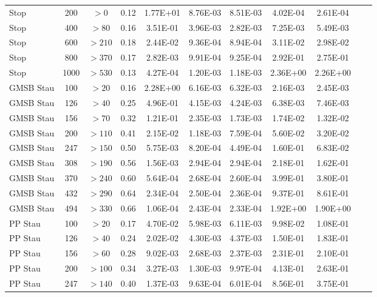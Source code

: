 \begin{table}
\begin{center}
\begin{tabular}{|l|c|c|c|c|c|c|c|c|c|c|}
Stop                 &  200 & $>0$    &   0.12 & 1.77E+01 & 8.76E-03 & 8.51E-03 & 4.02E-04 & 2.61E-04\\
Stop                 &  400 & $>80$   &   0.16 & 3.51E-01 & 3.96E-03 & 2.82E-03 & 7.25E-03 & 5.49E-03\\
Stop                 &  600 & $>210$  &   0.18 & 2.44E-02 & 9.36E-04 & 8.94E-04 & 3.11E-02 & 2.98E-02\\
Stop                 &  800 & $>370$  &   0.17 & 2.82E-03 & 9.91E-04 & 9.25E-04 & 2.92E-01 & 2.75E-01\\
Stop                 & 1000 & $>530$  &   0.13 & 4.27E-04 & 1.20E-03 & 1.18E-03 & 2.36E+00 & 2.26E+00\\
GMSB Stau            &  100 & $>20$   &   0.16 & 2.28E+00 & 6.16E-03 & 6.32E-03 & 2.16E-03 & 2.45E-03\\
GMSB Stau            &  126 & $>40$   &   0.25 & 4.96E-01 & 4.15E-03 & 4.24E-03 & 6.38E-03 & 7.46E-03\\
GMSB Stau            &  156 & $>70$   &   0.32 & 1.21E-01 & 2.35E-03 & 1.73E-03 & 1.74E-02 & 1.32E-02\\
GMSB Stau            &  200 & $>110$  &   0.41 & 2.15E-02 & 1.18E-03 & 7.59E-04 & 5.60E-02 & 3.20E-02\\
GMSB Stau            &  247 & $>150$  &   0.50 & 5.75E-03 & 8.20E-04 & 4.49E-04 & 1.60E-01 & 6.83E-02\\
GMSB Stau            &  308 & $>190$  &   0.56 & 1.56E-03 & 2.94E-04 & 2.94E-04 & 2.18E-01 & 1.62E-01\\
GMSB Stau            &  370 & $>240$  &   0.60 & 5.64E-04 & 2.68E-04 & 2.60E-04 & 3.99E-01 & 3.80E-01\\
GMSB Stau            &  432 & $>290$  &   0.64 & 2.34E-04 & 2.50E-04 & 2.36E-04 & 9.37E-01 & 8.61E-01\\
GMSB Stau            &  494 & $>330$  &   0.66 & 1.06E-04 & 2.43E-04 & 2.33E-04 & 1.92E+00 & 1.90E+00\\
PP Stau              &  100 & $>20$   &   0.17 & 4.70E-02 & 5.98E-03 & 6.11E-03 & 9.98E-02 & 1.08E-01\\
PP Stau              &  126 & $>40$   &   0.24 & 2.02E-02 & 4.30E-03 & 4.37E-03 & 1.50E-01 & 1.83E-01\\
PP Stau              &  156 & $>60$   &   0.28 & 9.02E-03 & 2.68E-03 & 2.37E-03 & 2.31E-01 & 2.10E-01\\
PP Stau              &  200 & $>100$  &   0.34 & 3.27E-03 & 1.30E-03 & 9.97E-04 & 4.13E-01 & 2.63E-01\\
PP Stau              &  247 & $>140$  &   0.40 & 1.37E-03 & 9.63E-04 & 6.01E-04 & 8.56E-01 & 3.75E-01\\

\end{tabular}
\end{center}
\end{table}
